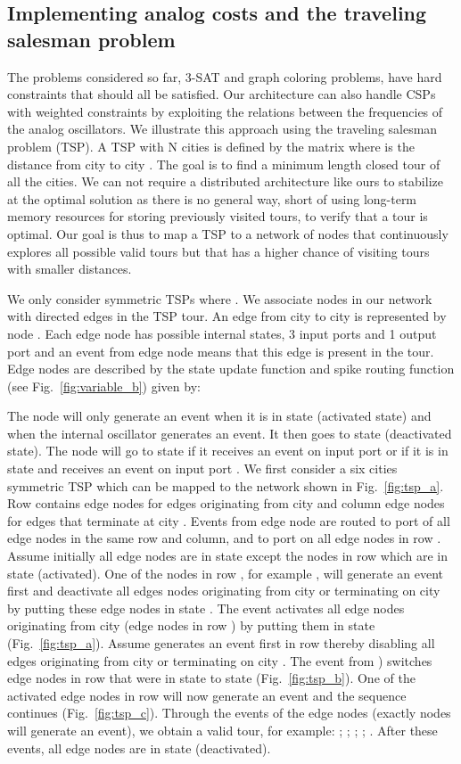\documentclass[10pt]{article}
\begin{document}
\subsection*{Implementing analog costs and the traveling salesman problem}
The problems considered so far, 3-SAT and graph coloring problems, have hard constraints that should all be satisfied. Our architecture can also handle CSPs with weighted constraints by exploiting the relations between the frequencies of the analog oscillators. We illustrate this approach using the traveling salesman problem (TSP). A TSP with N cities is defined by the  matrix  where  is the distance from city  to city . The goal is to find a minimum length closed tour of all the cities. We can not require a distributed architecture like ours to stabilize at the optimal solution as there is no general way, short of using long-term memory resources for storing previously visited tours, to verify that a tour is optimal. Our goal is thus to map a TSP to a network of nodes that continuously explores all possible valid tours but that has a higher chance of visiting tours with smaller distances. 

We only consider symmetric TSPs where . We associate nodes in our network with directed edges in the TSP tour. An edge from city  to city  is represented by node . Each edge node has  possible internal states, 3 input ports and 1 output port and an event from edge node  means that this edge is present in the tour. Edge nodes are described by the state update function  and spike routing function  (see Fig.~\ref{fig:variable_b}) given by:

The node will only generate an event when it is in state  (activated state) and when the internal oscillator generates an event. It then goes to state  (deactivated state). The node will go to state  if it receives an event on input port  or if it is in state  and receives an event on input port .
We first consider a six cities symmetric TSP which can be mapped to the network shown in Fig.~\ref{fig:tsp_a}. Row  contains edge nodes for edges originating from city  and column  edge nodes for edges that terminate at city . Events from edge node  are routed to port  of all edge nodes in the same row and column, and to port  on all edge nodes in row . Assume initially all edge nodes are in state  except the nodes in row  which are in state  (activated). One of the nodes in row , for example , will generate an event first and deactivate all edges nodes originating from city  or terminating on city  by putting these edge nodes in state . The  event activates all edge nodes originating from city  (edge nodes in row ) by putting them in state  (Fig.~\ref{fig:tsp_a}). Assume  generates an event first in row  thereby disabling all edges originating from city  or terminating on city . The event from ) switches edge nodes in row  that were in state  to state  (Fig.~\ref{fig:tsp_b}). One of the activated edge nodes in row  will now generate an event and the sequence continues (Fig.~\ref{fig:tsp_c}). Through the events of the edge nodes (exactly  nodes will generate an event), we obtain a valid tour, for example: ; ; ; ; .  After these  events, all edge nodes are in state  (deactivated). 
\end{document}
